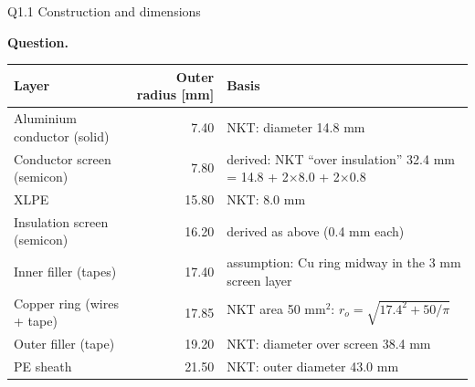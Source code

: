 \documentclass[aspectratio=169,10pt]{beamer}
\newcommand{\qbox}[1]{\begin{tcolorbox}[colback=KULBlue!5,colframe=KULBlue!60,boxrule=0.3pt,
  leftrule=1.5pt,arc=0pt,boxsep=0pt,left=4pt,right=4pt,top=2.5pt,bottom=2.5pt,
  before skip=0pt,after skip=6pt,fontupper=\scriptsize]\textbf{Question.} #1\end{tcolorbox}}
\begin{document}
\begin{frame}{Q1.1 Construction and dimensions}
\qbox{\QuestionOneOne}
\footnotesize\AnsOneOne\par\smallskip
\scriptsize\centering\renewcommand{\arraystretch}{0.85}
\begin{tabular}{@{}lrl@{}}\toprule
Layer & Outer radius [mm] & Basis\\\midrule
Aluminium conductor (solid) & 7.40 & NKT: diameter 14.8 mm\\
Conductor screen (semicon) & 7.80 & derived: NKT ``over insulation'' 32.4 mm = 14.8 + 2$\times$8.0 + 2$\times$0.8\\
XLPE & 15.80 & NKT: 8.0 mm\\
Insulation screen (semicon) & 16.20 & derived as above (0.4 mm each)\\
Inner filler (tapes) & 17.40 & assumption: Cu ring midway in the 3 mm screen layer\\
Copper ring (wires + tape) & 17.85 & NKT area 50 mm$^2$: $r_o=\sqrt{17.4^2+50/\pi}$\\
Outer filler (tape) & 19.20 & NKT: diameter over screen 38.4 mm\\
PE sheath & 21.50 & NKT: outer diameter 43.0 mm\\\bottomrule
\end{tabular}
\end{frame}
\end{document}
